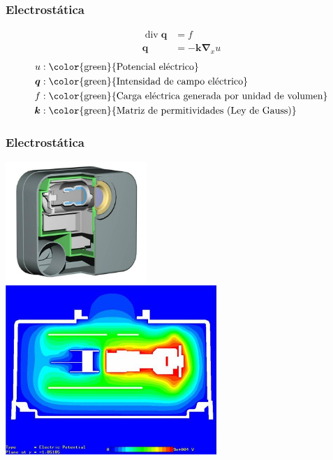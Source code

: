 \documentclass[handout]{beamer}
\begin{document}
\begin{frame}
\frametitle{Electrostática}
\begin{align*}
\operatorname{div} \bm{q}&=f  \\
\bm{q}&=-\bm{k} \bm{\nabla}_{x} u
\end{align*}
\begin{align*}
u  &:\textrm{\color{green}{Potencial eléctrico}} \\
\bm{q}&:\textrm{\color{green}{Intensidad de campo eléctrico}} \\
f&:\textrm{\color{green}{Carga eléctrica generada por unidad de volumen}} \\
\bm{k}&:\textrm{\color{green}{Matriz de permitividades (Ley de Gauss)}}
\end{align*}
\end{frame}
\begin{frame}
\frametitle{Electrostática}
\begin{center}
\includegraphics[width=0.4\textwidth]{Model_Geometry_600_514.jpg}
\includegraphics[width=0.6\textwidth]{electric_fields_contour_600_480.jpg}
\end{center}
\end{frame}
\end{document}
